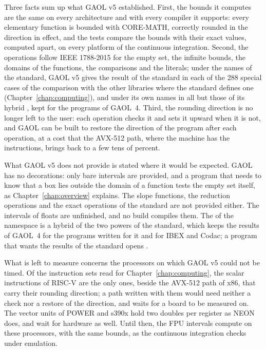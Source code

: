 \documentclass[12pt,a4paper,twoside,openright]{book}
\begin{document}
\medskip
Three facts sum up what GAOL v5 established. First, the bounds it computes
are the same on every architecture and with every compiler it supports:
every elementary function is bounded with CORE-MATH, correctly rounded in the
direction in effect, and the tests compare the bounds with their exact
values, computed apart, on every platform of the continuous integration.
Second, the operations follow IEEE 1788-2015 for the empty set, the infinite
bounds, the domains of the functions, the comparisons and the literals; under
the names of the standard, GAOL v5 gives the result of the standard in each of
the 288 special cases of the comparison with the other libraries where the standard
defines one (Chapter~\ref{chap:computing}), and under its
own names in all but those of its hybrid , kept for the programs of
GAOL~4. Third, the rounding direction is no longer left to the user: each
operation checks it and sets it upward when it is not, and GAOL can be built
to restore the direction of the program after each operation, at a cost that
the AVX-512 path, where the machine has the instructions, brings back to a
few tens of percent.

\medskip
What GAOL v5 does not provide is stated where it would be expected. GAOL has
no decorations: only bare intervals are provided, and a program that needs
to know that a box lies outside the domain of a function tests the empty
set itself, as Chapter~\ref{chap:overview} explains. The slope
functions, the reduction operations and the exact operations of the standard
are not provided either. The intervals of floats are unfinished, and no build
compiles them. The  of the namespace  is a hybrid of the
two powers of the standard, which keeps the results of GAOL~4 for the
programs written for it and for IBEX and Codac; a program that wants the
results of the standard opens .

\medskip
What is left to measure concerns the processors on which GAOL v5 could not be timed.
Of the instruction sets read for Chapter~\ref{chap:computing}, the scalar
instructions of RISC-V are the only ones, beside the AVX-512 path of x86,
that carry their rounding direction; a path written with them would need
neither a check nor a restore of the direction, and waits for a board to be
measured on. The vector units of POWER and s390x hold two doubles per
register as NEON does, and wait for hardware as well. Until then, the FPU
intervals compute on these processors, with the same bounds, as the
continuous integration checks under emulation.
\end{document}
